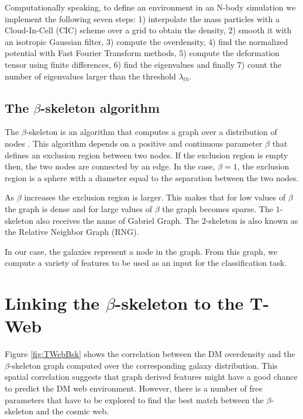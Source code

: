 \documentclass[usenatbib]{mnras}
\begin{document}
Computationally speaking, to define an environment in an N-body
simulation we implement the following seven steps: 1) interpolate the
mass particles with a Cloud-In-Cell  (CIC) scheme over a grid to
obtain the density, 2) smooth it with an isotropic Gaussian filter,
3) compute the overdensity, 4) find the normalized potential with Fast
Fourier Transform  methods, 5) compute the deformation tensor using
finite differences, 6) find the eigenvalues and finally 7) count the
number of eigenvalues larger than the threshold $\lambda_{th}$. 


\subsection{The $\beta$-skeleton algorithm}

The $\beta$-skeleton is an algorithm that computes a graph over a
distribution of nodes \citep{Kirkpatrick1985, Fang2019}.  
This algorithm depends on a positive and continuous parameter $\beta$
that defines an exclusion region between two nodes.
If the exclusion region is empty then, the two nodes are connected by an edge.  
In the case, $\beta=1$, the exclusion region is a sphere with a
diameter equal to the separation between the two nodes.  

As $\beta$ increases the exclusion region is larger.
This makes that for low values of $\beta$ the graph is dense and for
large values of $\beta$ the graph becomes sparse. 
The $1$-skeleton also receives the name of Gabriel Graph.  
The $2$-skeleton is also known as the Relative Neighbor Graph (RNG). 

In our case, the galaxies represent a node in the graph.
From this graph, we compute a variety of features to be used as an input for the classification task. 



\section{Linking the $\beta$-skeleton to the T-Web}\label{sec:link}

Figure \ref{fig:TWebBsk} shows the correlation between the DM overdensity
and the $\beta$-skeleton graph computed over the corresponding galaxy
distribution. 
This spatial correlation suggests that graph derived features might have
a good chance to predict the DM web environment. 
However, there is a number of free parameters that have to be explored
to find the best match between the $\beta$-skeleton and the cosmic web.
\end{document}
